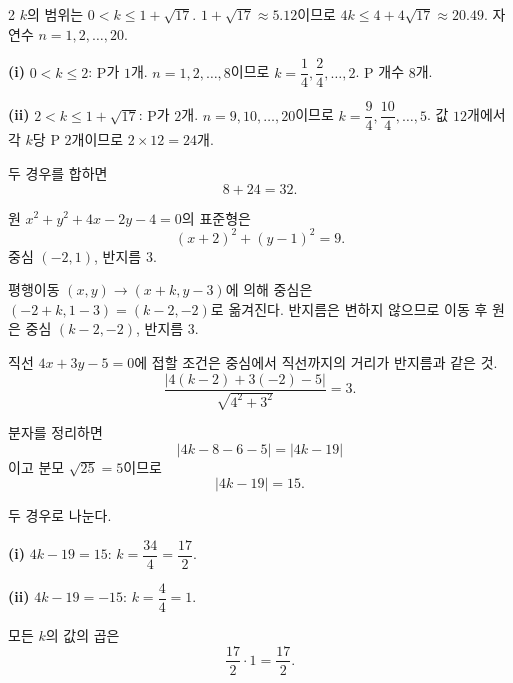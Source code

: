 \documentclass[10pt,fleqn]{article}
\renewcommand{\solpart}[1]{%
  \par\addvspace{10pt}\noindent
  {\sffamily\bfseries\color{black}(#1)}\hspace{3mm}\ignorespaces%
}
\renewcommand{\subcase}[1]{%
  \par\addvspace{6pt}\noindent
  {\sffamily\bfseries\color{black}(#1)}\hspace{2mm}\ignorespaces%
}
\begin{document}
\begin{multicols}{2}
$k$의 범위는 $0 < k \le 1 + \sqrt{17}$. $1 + \sqrt{17} \approx 5.12$이므로 $4k \le 4 + 4\sqrt{17} \approx 20.49$. 자연수 $n = 1, 2, \dots, 20$.

\subcase{i} $0 < k \le 2$: $\mathrm{P}$가 $1$개. $n = 1, 2, \dots, 8$이므로 $k = \dfrac{1}{4}, \dfrac{2}{4}, \dots, 2$. $\mathrm{P}$ 개수 $8$개.

\subcase{ii} $2 < k \le 1 + \sqrt{17}$: $\mathrm{P}$가 $2$개. $n = 9, 10, \dots, 20$이므로 $k = \dfrac{9}{4}, \dfrac{10}{4}, \dots, 5$. 값 $12$개에서 각 $k$당 $\mathrm{P}$ $2$개이므로 $2 \times 12 = 24$개.

두 경우를 합하면
\[ 8 + 24 = 32. \]



원 $x^{2} + y^{2} + 4x - 2y - 4 = 0$의 표준형은
\[ (x + 2)^{2} + (y - 1)^{2} = 9. \]
중심 $(-2, 1)$, 반지름 $3$.

평행이동 $(x, y) \to (x + k, y - 3)$에 의해 중심은 $(-2 + k, 1 - 3) = (k - 2, -2)$로 옮겨진다. 반지름은 변하지 않으므로 이동 후 원은 중심 $(k - 2, -2)$, 반지름 $3$.

직선 $4x + 3y - 5 = 0$에 접할 조건은 중심에서 직선까지의 거리가 반지름과 같은 것.
\[ \dfrac{|4(k-2) + 3(-2) - 5|}{\sqrt{4^{2} + 3^{2}}} = 3. \]

분자를 정리하면
\[ |4k - 8 - 6 - 5| = |4k - 19| \]
이고 분모 $\sqrt{25} = 5$이므로
\[ |4k - 19| = 15. \]

두 경우로 나눈다.

\solpart{i} $4k - 19 = 15$: $k = \dfrac{34}{4} = \dfrac{17}{2}$.

\solpart{ii} $4k - 19 = -15$: $k = \dfrac{4}{4} = 1$.

모든 $k$의 값의 곱은
\[ \dfrac{17}{2} \cdot 1 = \dfrac{17}{2}. \]


\end{multicols}
\end{document}
